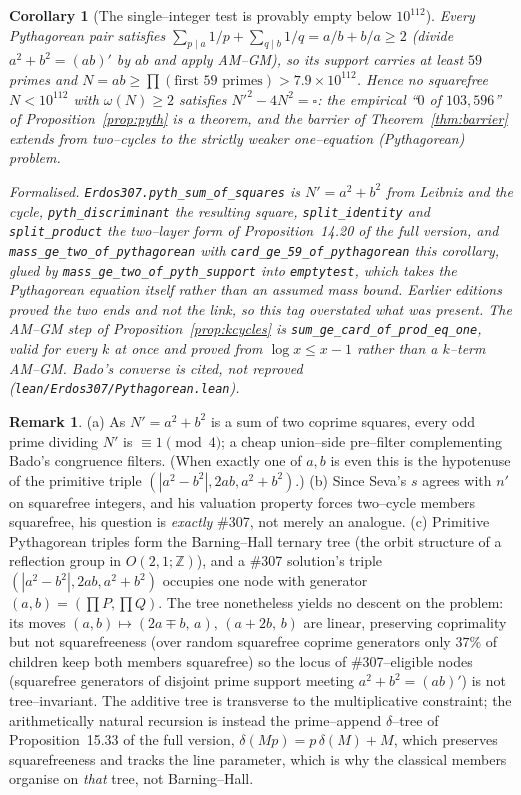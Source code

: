 \documentclass[11pt]{article}
\newtheorem{corollary}[theorem]{Corollary}
\theoremstyle{definition}
\newtheorem{remark}[theorem]{Remark}
\begin{document}
\begin{corollary}[The single--integer test is provably empty below $10^{112}$]\label{cor:emptytest}
Every Pythagorean pair satisfies $\sum_{p\mid a}1/p+\sum_{q\mid b}1/q=a/b+b/a\ge2$ (divide
$a^2+b^2=(ab)'$ by $ab$ and apply AM--GM), so its support carries at least $59$ primes and
$N=ab\ge\prod(\text{first }59\text{ primes})>7.9\times10^{112}$. Hence no squarefree $N<10^{112}$ with
$\omega(N)\ge2$ satisfies $N'^2-4N^2=\square$: the empirical ``$0$ of $103{,}596$'' of
Proposition~\ref{prop:pyth} is a theorem, and the barrier of Theorem~\ref{thm:barrier} extends from
two--cycles to the strictly weaker one--equation (Pythagorean) problem.

\textup{Formalised.} \texttt{Erdos307.pyth\_sum\_of\_squares} is $N'=a^2+b^2$ from Leibniz and the
cycle, \texttt{pyth\_discriminant} the resulting square, \texttt{split\_identity} and
\texttt{split\_product} the two--layer form of Proposition~14.20 of the full version, and
\texttt{mass\_ge\_two\_of\_pythagorean} with \texttt{card\_ge\_59\_of\_pythagorean} this corollary,
glued by \texttt{mass\_ge\_two\_of\_pyth\_support} into \texttt{emptytest}, which takes the
Pythagorean equation itself rather than an assumed mass bound. Earlier editions proved the two ends
and not the link, so this tag overstated what was present.
The AM--GM step of Proposition~\ref{prop:kcycles} is \texttt{sum\_ge\_card\_of\_prod\_eq\_one}, valid
for every $k$ at once and proved from $\log x\le x-1$ rather than a $k$--term AM--GM. Bado's converse
is cited, not reproved \textup{(\texttt{lean/Erdos307/Pythagorean.lean})}.
\end{corollary}

\begin{remark}
(a) As $N'=a^2+b^2$ is a sum of two coprime squares, every odd prime dividing $N'$ is
$\equiv1\pmod4$; a cheap union--side pre--filter complementing Bado's congruence filters. (When
exactly one of $a,b$ is even this is the hypotenuse of the primitive triple $(|a^2-b^2|,2ab,a^2+b^2)$.)
(b) Since Seva's $s$ agrees with $n'$ on squarefree integers, and his valuation property forces
two--cycle members squarefree, his question is \emph{exactly} \#307, not merely an analogue.
(c) Primitive Pythagorean triples form the Barning--Hall ternary tree (the orbit structure of a
reflection group in $O(2,1;\mathbb{Z})$), and a \#307 solution's triple $(|a^2-b^2|,2ab,a^2+b^2)$
occupies one node with generator $(a,b)=(\prod P,\prod Q)$. The tree nonetheless yields no descent on
the problem: its moves $(a,b)\mapsto(2a\mp b,\,a),\,(a+2b,\,b)$ are linear, preserving coprimality but
not squarefreeness (over random squarefree coprime generators only $37\%$ of children keep both
members squarefree) so the locus of \#307--eligible nodes (squarefree generators of disjoint prime
support meeting $a^2+b^2=(ab)'$) is not tree--invariant. The additive tree is transverse to the
multiplicative constraint; the arithmetically natural recursion is instead the prime--append
$\delta$--tree of Proposition~15.33 of the full version, $\delta(Mp)=p\,\delta(M)+M$, which preserves
squarefreeness and tracks the line parameter, which is why the classical members organise on
\emph{that} tree, not Barning--Hall.
\end{remark}
\end{document}
